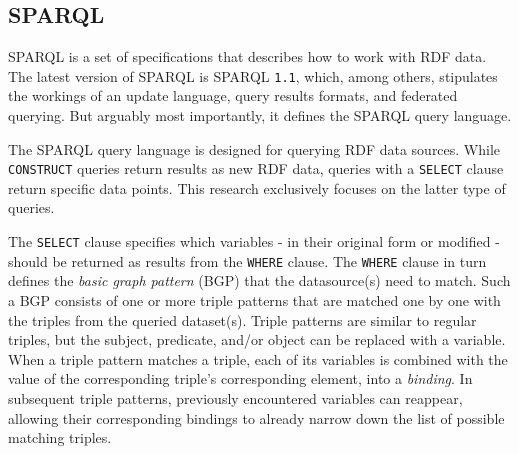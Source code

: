 \subsection{SPARQL}
\label{subsec:sparql}

SPARQL is a set of specifications that describes how to work with RDF data. The latest version of SPARQL is SPARQL \texttt{1.1}, which, among others, stipulates the workings of an update language, query results formats, and federated querying. But arguably most importantly, it defines the SPARQL query language. \citep{buil2013sparql}

The SPARQL query language is designed for querying RDF data sources. While \texttt{CONSTRUCT} queries return results as new RDF data, queries with a \texttt{SELECT} clause return specific data points. This research exclusively focuses on the latter type of queries. \citep{seaborn2013sparql}

The \texttt{SELECT} clause specifies which variables - in their original form or modified - should be returned as results from the \texttt{WHERE} clause. The \texttt{WHERE} clause in turn defines the \textit{basic graph pattern} (BGP) that the datasource(s) need to match. Such a BGP consists of one or more triple patterns that are matched one by one with the triples from the queried dataset(s). Triple patterns are similar to regular triples, but the subject, predicate, and/or object can be replaced with a variable. When a triple pattern matches a triple, each of its variables is combined with the value of the corresponding triple's corresponding element, into a \textit{binding}. In subsequent triple patterns, previously encountered variables can reappear, allowing their corresponding bindings to already narrow down the list of possible matching triples. \citep{seaborn2013sparql}

